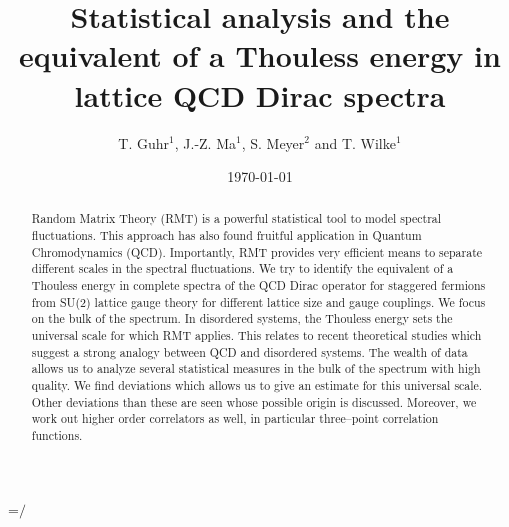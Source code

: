 
\makeatletter
\newbox\slashbox \setbox\slashbox=\hbox{\large$/$}
\def\pslash#1{\setbox\@tempboxa=\hbox{$#1$}
  \@tempdima=0.5\wd\slashbox \advance\@tempdima 0.5\wd\@tempboxa
  \copy\slashbox \kern-\@tempdima \box\@tempboxa}
\def\slash{\protect\pslash}
\makeatother


\draft

\title{Statistical analysis and the equivalent of a Thouless energy in lattice
       QCD Dirac spectra}
\author{T. Guhr$^1$, J.-Z. Ma$^1$, S. Meyer$^2$ and  T. Wilke$^1$}

\address{$^1$Max Planck Institut f\"ur Kernphysik, Postfach 103980,
D-69029 Heidelberg, Germany\\
$^2$Fachbereich Physik, Universit\"at Kaiserslautern,
Theoretische Physik, D-67663 Kaiserslautern, Germany}

\date{\today}

\maketitle

\begin{abstract}
  Random Matrix Theory (RMT) is a powerful statistical tool to model
  spectral fluctuations. This approach has also found fruitful
  application in Quantum Chromodynamics (QCD).  Importantly, RMT
  provides very efficient means to separate different scales in the
  spectral fluctuations.  We try to identify the equivalent of a
  Thouless energy in complete spectra of the QCD Dirac operator for
  staggered fermions from SU(2) lattice gauge theory for different
  lattice size and gauge couplings.  We focus on the bulk of the
  spectrum.  In disordered systems, the Thouless energy sets the
  universal scale for which RMT applies.  This relates to recent
  theoretical studies which suggest a strong analogy between QCD and
  disordered systems.  The wealth of data allows us to analyze several
  statistical measures in the bulk of the spectrum with high quality.
  We find deviations which allows us to give an estimate for this
  universal scale.  Other deviations than these are seen whose
  possible origin is discussed.  Moreover, we work out higher order
  correlators as well, in particular three--point correlation
  functions.
\end{abstract}

